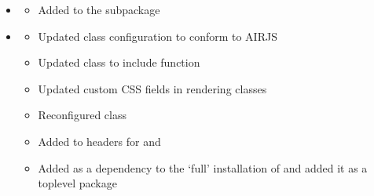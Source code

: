 \documentclass[letterpaper,10pt,english]{sphinxmanual}
\begin{document}
\begin{itemize}
\begin{description}
\begin{itemize}
\item {} 
\sphinxAtStartPar
Changed to full import of  in  subpackage

\end{itemize}

\end{description}

\item {} \begin{description}
\begin{itemize}
\item {} 
\sphinxAtStartPar
Added  to the  subpackage

\end{itemize}

\end{description}

\item {} \begin{description}
\begin{itemize}
\item {} 
\sphinxAtStartPar
Updated  class configuration to conform to AIRJS

\item {} 
\sphinxAtStartPar
Updated  class to include  function

\item {} 
\sphinxAtStartPar
Updated custom CSS fields in rendering classes

\item {} 
\sphinxAtStartPar
Reconfigured  class

\item {} 
\sphinxAtStartPar
Added  to headers for  and 

\item {} 
\sphinxAtStartPar
Added  as a dependency to the ‘full’ installation of  and added it as a top\sphinxhyphen{}level package

\end{itemize}

\end{description}


\end{itemize}
\end{document}
